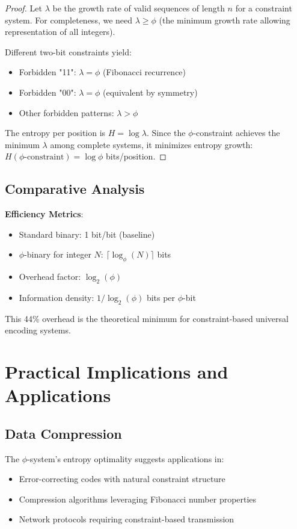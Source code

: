 \documentclass[12pt,letterpaper]{article}
\begin{document}
\begin{proof}
Let $\lambda$ be the growth rate of valid sequences of length $n$ for a constraint system. For completeness, we need $\lambda \geq \phi$ (the minimum growth rate allowing representation of all integers).

Different two-bit constraints yield:
\begin{itemize}
\item Forbidden "11": $\lambda = \phi$ (Fibonacci recurrence)
\item Forbidden "00": $\lambda = \phi$ (equivalent by symmetry)  
\item Other forbidden patterns: $\lambda > \phi$
\end{itemize}

The entropy per position is $H = \log \lambda$. Since the $\phi$-constraint achieves the minimum $\lambda$ among complete systems, it minimizes entropy growth: $H(\phi\text{-constraint}) = \log \phi$ bits/position.
\end{proof}

\subsection{Comparative Analysis}

\textbf{Efficiency Metrics}:
\begin{itemize}
\item Standard binary: 1 bit/bit (baseline)
\item $\phi$-binary for integer $N$: $\lceil\log_\phi(N)\rceil$ bits
\item Overhead factor: $\log_2(\phi)$
\item Information density: $1/\log_2(\phi)$ bits per $\phi$-bit
\end{itemize}

This 44\% overhead is the theoretical minimum for constraint-based universal encoding systems.

\section{Practical Implications and Applications}

\subsection{Data Compression}

The $\phi$-system's entropy optimality suggests applications in:
\begin{itemize}
\item Error-correcting codes with natural constraint structure
\item Compression algorithms leveraging Fibonacci number properties
\item Network protocols requiring constraint-based transmission
\end{itemize}
\end{document}
